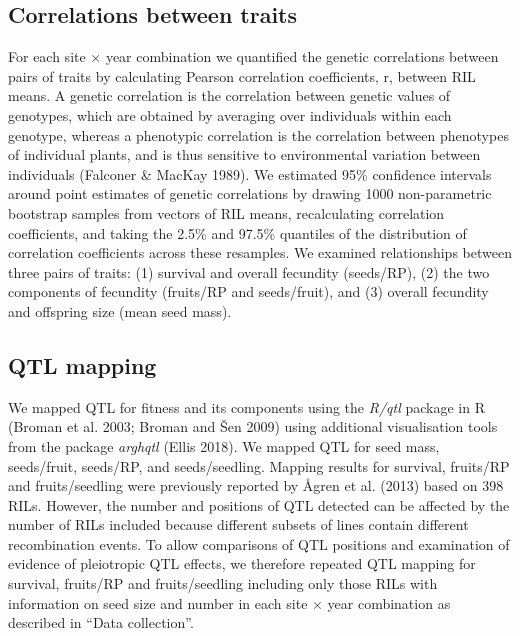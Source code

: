 \documentclass[]{article}
\begin{document}
\hypertarget{correlations-between-traits}{%
\subsection{Correlations between traits}\label{correlations-between-traits}}

For each site × year combination we quantified the genetic correlations between pairs of traits by calculating Pearson correlation coefficients, r, between RIL means. A genetic correlation is the correlation between genetic values of genotypes, which are obtained by averaging over individuals within each genotype, whereas a phenotypic correlation is the correlation between phenotypes of individual plants, and is thus sensitive to environmental variation between individuals (Falconer \& MacKay 1989). We estimated 95\% confidence intervals around point estimates of genetic correlations by drawing 1000 non-parametric bootstrap samples from vectors of RIL means, recalculating correlation coefficients, and taking the 2.5\% and 97.5\% quantiles of the distribution of correlation coefficients across these resamples. We examined relationships between three pairs of traits: (1) survival and overall fecundity (seeds/RP), (2) the two components of fecundity (fruits/RP and seeds/fruit), and (3) overall fecundity and offspring size (mean seed mass).

\hypertarget{qtl-mapping}{%
\subsection{QTL mapping}\label{qtl-mapping}}

We mapped QTL for fitness and its components using the \emph{R/qtl} package in R (Broman et al. 2003; Broman and Šen 2009) using additional visualisation tools from the package \emph{arghqtl} (Ellis 2018). We mapped QTL for seed mass, seeds/fruit, seeds/RP, and seeds/seedling. Mapping results for survival, fruits/RP and fruits/seedling were previously reported by Ågren et al. (2013) based on 398 RILs. However, the number and positions of QTL detected can be affected by the number of RILs included because different subsets of lines contain different recombination events. To allow comparisons of QTL positions and examination of evidence of pleiotropic QTL effects, we therefore repeated QTL mapping for survival, fruits/RP and fruits/seedling including only those RILs with information on seed size and number in each site × year combination as described in ``Data collection''.
\end{document}
